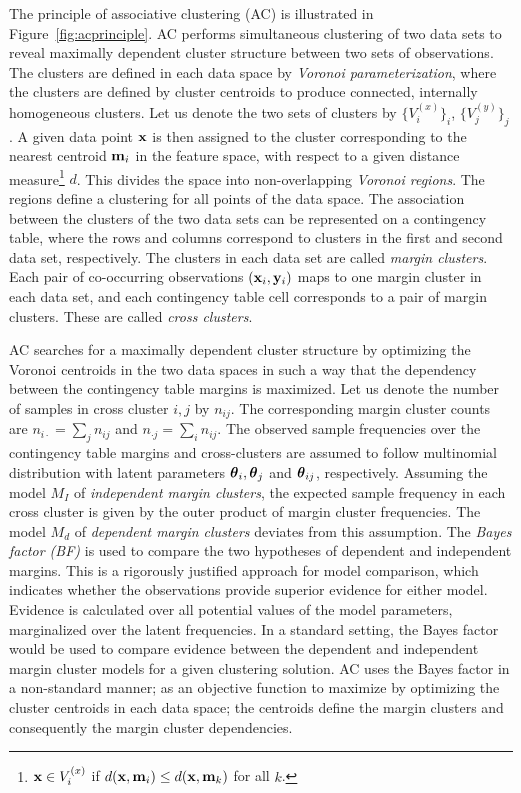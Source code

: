 The principle of associative clustering (AC) is illustrated in
Figure~\ref{fig:acprinciple}. AC performs simultaneous clustering of
two data sets to reveal maximally dependent cluster structure between
two sets of observations. The clusters are defined in each data space
by {\it Voronoi parameterization}, where the clusters are defined by
cluster centroids to produce connected, internally homogeneous
clusters.  Let us denote the two sets of clusters by
\(\{V^{(x)}_i\}_i\), \(\{V^{(y)}_j\}_j\).  A given data point \(\mathbf{x}\)
is then assigned to the cluster corresponding to the nearest centroid
\(\mathbf{m}_i\) in the feature space, with respect to a given distance
measure\footnote{\(\mathbf{x} \in V_i^{(x)}\) if \(d(\mathbf{x}, \mathbf{m}_i) \leq d(\mathbf{x},
  \mathbf{m}_k)\) for all \(k\).}  \(d\).  This divides the space into
non-overlapping {\em Voronoi regions}. The regions define a clustering
for all points of the data space. The association between the clusters
of the two data sets can be represented on a contingency table, where
the rows and columns correspond to clusters in the first and second
data set, respectively. The clusters in each data set are called {\it
  margin clusters}. Each pair of co-occurring observations $(\mathbf{x}_i,\mathbf{y}_i)$
maps to one margin cluster in each data set, and each contingency
table cell corresponds to a pair of margin clusters. These are called
{\it cross clusters}.

AC searches for a maximally dependent cluster structure by optimizing
the Voronoi centroids in the two data spaces in such a way that the
dependency between the contingency table margins is maximized. Let us
denote the number of samples in cross cluster \(i, j\) by
\(n_{ij}\). The corresponding margin cluster counts are $n_{i \cdot} =
\sum_j n_{ij}$ and $n_{\cdot j} = \sum_i n_{ij}$.  The observed sample
frequencies over the contingency table margins and cross-clusters are
assumed to follow multinomial distribution with latent parameters
\(\boldsymbol{\theta}_i, \boldsymbol{\theta}_j\) and \(\boldsymbol{\theta}_{ij}\), respectively.  Assuming the
model $M_I$ of {\it independent margin clusters}, the expected sample
frequency in each cross cluster is given by the outer product of
margin cluster frequencies.  The model $M_d$ of \emph{dependent margin
  clusters} deviates from this assumption. The {\it Bayes factor (BF)}
is used to compare the two hypotheses of dependent and independent
margins. This is a rigorously justified approach for model comparison,
which indicates whether the observations provide superior evidence for
either model. Evidence is calculated over all potential values of the
model parameters, marginalized over the latent frequencies. In a
standard setting, the Bayes factor would be used to compare evidence
between the dependent and independent margin cluster models for a
given clustering solution. AC uses the Bayes factor in a non-standard
manner; as an objective function to maximize by optimizing the cluster
centroids in each data space; the centroids define the margin clusters
and consequently the margin cluster dependencies.

